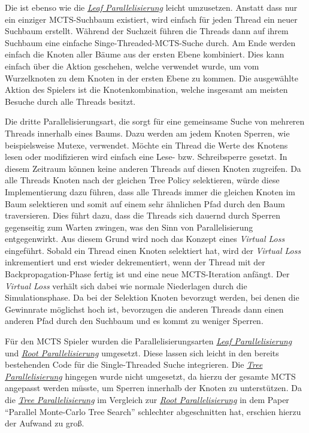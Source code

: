 \pagebreak

Die  ist ebenso wie die \hyperref[text:leaf-parallelization]{\emph{Leaf Parallelisierung}} leicht umzusetzen. Anstatt dass nur ein einziger \ac{MCTS}-Suchbaum existiert, wird einfach für jeden Thread ein neuer Suchbaum erstellt. Während der Suchzeit führen die Threads dann auf ihrem Suchbaum eine einfache Singe-Threaded-\ac{MCTS}-Suche durch. Am Ende werden einfach die Knoten aller Bäume aus der ersten Ebene kombiniert. Dies kann einfach über die Aktion geschehen, welche verwendet wurde, um vom Wurzelknoten zu dem Knoten in der ersten Ebene zu kommen. Die ausgewählte Aktion des Spielers ist die Knotenkombination, welche insgesamt am meisten Besuche durch alle Threads besitzt. \cite[S. 63]{2008.ParallelMCTS}

Die dritte Parallelisierungsart, die  sorgt für eine gemeinsame Suche von mehreren Threads innerhalb eines Baums. Dazu werden am jedem Knoten Sperren, wie beispielsweise Mutexe, verwendet. Möchte ein Thread die Werte des Knotens lesen oder modifizieren wird einfach eine Lese- bzw. Schreibsperre gesetzt. In diesem Zeitraum können keine anderen Threads auf diesen Knoten zugreifen. Da alle Threads Knoten nach der gleichen Tree Policy selektieren, würde diese Implementierung dazu führen, dass alle Threads immer die gleichen Knoten im Baum selektieren und somit auf einem sehr ähnlichen Pfad durch den Baum traversieren. Dies führt dazu, dass die Threads sich dauernd durch Sperren gegenseitig zum Warten zwingen, was den Sinn von Parallelisierung entgegenwirkt. Aus diesem Grund wird noch das Konzept eines \emph{Virtual Loss} eingeführt. Sobald ein Thread einen Knoten selektiert hat, wird der \emph{Virtual Loss} inkrementiert und erst wieder dekrementiert, wenn der Thread mit der Backpropagation-Phase fertig ist und eine neue \ac{MCTS}-Iteration anfängt. Der \emph{Virtual Loss} verhält sich dabei wie normale Niederlagen durch die Simulationsphase. Da bei der Selektion Knoten bevorzugt werden, bei denen die Gewinnrate möglichst hoch ist, bevorzugen die anderen Threads dann einen anderen Pfad durch den Suchbaum und es kommt zu weniger Sperren. \cite[S. 64]{2008.ParallelMCTS}

Für den \ac{MCTS} Spieler wurden die Parallelisierungsarten \hyperref[text:leaf-parallelization]{\emph{Leaf Parallelisierung}} und \hyperref[text:root-parallelization]{\emph{Root Parallelisierung}} umgesetzt. Diese lassen sich leicht in den bereits bestehenden Code für die Single-Threaded Suche integrieren. Die \hyperref[text:tree-parallelization]{\emph{Tree Parallelisierung}} hingegen wurde nicht umgesetzt, da hierzu der gesamte \ac{MCTS} angepasst werden müsste, um Sperren innerhalb der Knoten zu unterstützen. Da die \hyperref[text:tree-parallelization]{\emph{Tree Parallelisierung}} im Vergleich zur \hyperref[text:root-parallelization]{\emph{Root Parallelisierung}} in dem Paper \enquote{Parallel Monte-Carlo Tree Search} \cite[S. 69]{2008.ParallelMCTS} schlechter abgeschnitten hat, erschien hierzu der Aufwand zu groß.

